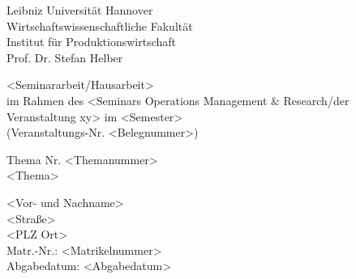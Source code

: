 \begin{titlepage}
    Leibniz Universität Hannover\\
    Wirtschaftswissenschaftliche Fakultät\\
    Institut für Produktionswirtschaft\\
    Prof. Dr. Stefan Helber
    
    \vspace{4cm}
    
    \begin{center}
    <Seminararbeit/Hausarbeit>\\
    im Rahmen des <Seminars Operations Management \& Research/der Veranstaltung xy> im <Semester> \\
    (Veranstaltungs-Nr. <Belegnummer>)
    
    \vspace{2cm}
    
    Thema Nr. <Themanummer> \\ 
    {\Large <Thema>} 
    \end{center}
    
    \vfill 				   
    
    <Vor- und Nachname> \\
    <Straße> \\
    <PLZ Ort>\\
    Matr.-Nr.: <Matrikelnummer> \\[3mm] 
    Abgabedatum: <Abgabedatum>
\end{titlepage}